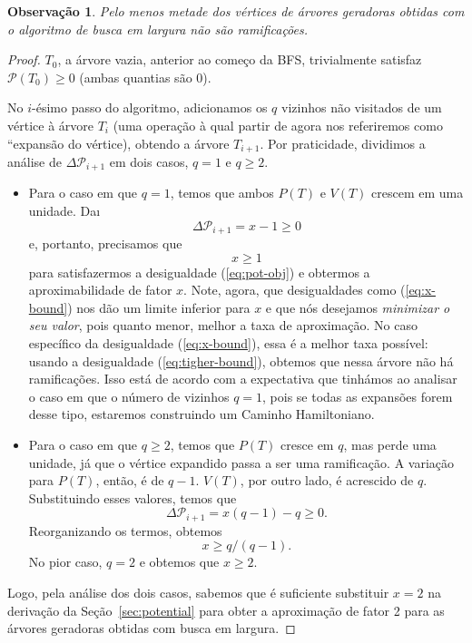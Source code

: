 \documentclass[conference]{IEEEtran}
\newtheorem{obs}{Observa\c{c}\~ao}[section]
\begin{document}
\begin{obs}
  Pelo menos metade dos v\'ertices de \'arvores geradoras obtidas com o algoritmo de busca em largura
  n\~ao s\~ao ramifica\c{c}\~oes.
\end{obs}
\begin{proof}
  $T_0$, a \'arvore vazia, anterior ao come\c{c}o da BFS, trivialmente satisfaz $\mathcal{P}(T_0) \ge 0$ (ambas quantias s\~ao 0).

  No $i$-\'esimo passo do algoritmo, adicionamos os $q$ vizinhos n\~ao visitados de um v\'ertice
  \`a \'arvore $T_i$ (uma opera\c{c}\~ao \`a qual partir de agora nos referiremos como
  ``expans\~ao do v\'ertice), obtendo a \'arvore $T_{i + 1}$. Por praticidade, dividimos a
  an\'alise de $\Delta \mathcal{P}_{i + 1}$ em dois casos, $q = 1$ e $q \ge 2$.
  \begin{itemize}
    \item Para o caso em que $q = 1$, temos que ambos $P(T)$ e $V(T)$ crescem em uma unidade. Da\i
      \begin{equation}
        \Delta \mathcal{P}_{i + 1} = x - 1 \ge 0
      \end{equation}
      e, portanto, precisamos que
      \begin{equation} \label{eq:x-bound}
        x \ge 1
      \end{equation}
      para satisfazermos a desigualdade (\ref{eq:pot-obj}) e obtermos a aproximabilidade de fator
      $x$. Note, agora, que desigualdades como (\ref{eq:x-bound}) nos d\~ao um limite inferior para
      $x$ e que n\'os desejamos \emph{minimizar o seu valor}, pois quanto menor, melhor a taxa de
      aproxima\c{c}\~ao. No caso espec\'ifico da desigualdade (\ref{eq:x-bound}), essa \'e a melhor
      taxa poss\'ivel: usando a desigualdade (\ref{eq:tigher-bound}), obtemos que nessa \'arvore
      n\~ao h\'a ramifica\c{c}\~oes. Isso est\'a de acordo com a expectativa que tinh\'amos ao
      analisar o caso em que o n\'umero de vizinhos $q = 1$, pois se todas as expans\~oes forem desse
      tipo, estaremos construindo um Caminho Hamiltoniano.
    \item Para o caso em que $q \ge 2$, temos que $P(T)$ cresce em $q$, mas perde uma unidade, j\'a
      que o v\'ertice expandido passa a ser uma ramifica\c{c}\~ao. A varia\c{c}\~ao para $P(T)$,
      ent\~ao, \'e de $q - 1$. $V(T)$, por outro lado, \'e acrescido de $q$. Substituindo esses
      valores, temos que
      \begin{equation}
        \Delta \mathcal{P}_{i + 1} = x(q - 1) - q \ge 0.
      \end{equation}
      Reorganizando os termos, obtemos
      \begin{equation} \label{eq:essential}
        x \ge q/(q - 1).
      \end{equation}
      No pior caso, $q = 2$ e obtemos que $x \ge 2$.
  \end{itemize}
  Logo, pela an\'alise dos dois casos, sabemos que \'e suficiente substituir $x = 2$ na
  deriva\c{c}\~ao da Se\c{c}\~ao~\ref{sec:potential} para obter a aproxima\c{c}\~ao de fator 2 para
  as \'arvores geradoras obtidas com busca em largura.
\end{proof}



\end{document}
